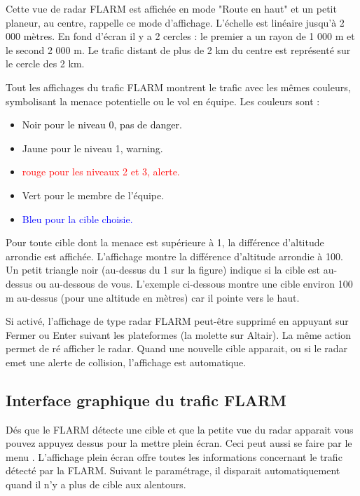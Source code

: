Cette vue de radar FLARM est affichée en mode "Route en haut" et un petit planeur, au centre, rappelle ce mode d'affichage. L'échelle est linéaire jusqu'à 2 000 mètres. En fond d'écran il y a 2 cercles : le premier a un rayon de 1 000 m et le second 2 000 m. Le trafic distant de plus de 2 km du centre est représenté sur le cercle des 2 km.

Tout les affichages du trafic FLARM montrent le trafic avec les mêmes couleurs, symbolisant la menace potentielle ou le vol en équipe. Les couleurs sont :
\begin{itemize}
\item \textcolor{black} {Noir pour le niveau 0, pas de danger.} 
\item \textcolor{warning} { Jaune pour le niveau 1, warning.}
\item \textcolor{red} {rouge pour les niveaux 2 et 3, alerte.}
\item \textcolor{teammate} {Vert pour le membre de l'équipe.}
\item \textcolor{blue} {Bleu pour la cible choisie.}
\end{itemize}

Pour toute cible dont la menace est supérieure à 1, la différence d'altitude arrondie est affichée. L'affichage montre la différence d'altitude arrondie à 100. Un petit triangle noir (au-dessus du 1 sur la figure) indique si la cible est au-dessus ou au-dessous de vous. L'exemple ci-dessous montre une cible environ 100 m au-dessus (pour une altitude en mètres) car il pointe vers le haut. 

Si activé, l'affichage de type radar FLARM peut-être supprimé en appuyant sur Fermer ou Enter suivant les plateformes (la molette sur Altair). La même action permet de ré afficher le radar. Quand une nouvelle cible apparait, ou si le radar emet une alerte de collision, l'affichage est automatique.

\subsection*{Interface graphique du trafic FLARM}\label{sec:flarm-traffic}

Dés que le FLARM détecte une cible et que la petite vue du radar apparait vous pouvez appuyez dessus pour la mettre plein écran. Ceci peut aussi se faire par le menu \blink{}.
L'affichage plein écran offre toutes les informations concernant le trafic détecté par la FLARM. Suivant le paramétrage, il disparait automatiquement quand il n'y a plus de cible aux alentours.

